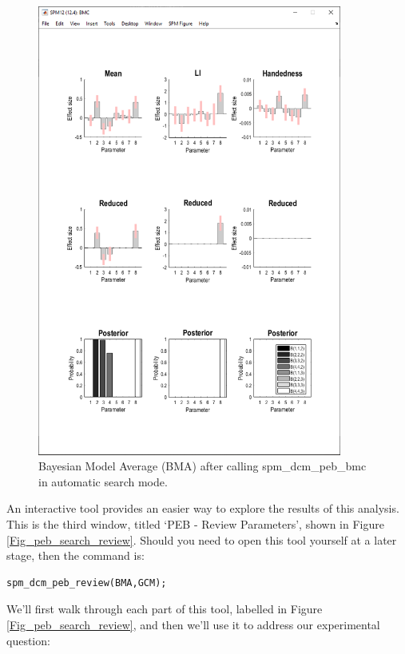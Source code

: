 \documentclass{article}
\begin{document}
\begin{figure}[ht]
\begin{center}
\includegraphics[width=10cm]{"Fig_peb_search_part2"}
\caption{Bayesian Model Average (BMA) after calling spm\_dcm\_peb\_bmc in automatic search mode.\label{Fig_peb_search_part2}}
\end{center}
\end{figure}

An interactive tool provides an easier way to explore the results of this analysis. This is the third window, titled `PEB - Review Parameters', shown in Figure \ref{Fig_peb_search_review}. Should you need to open this tool yourself at a later stage, then the command is:

\begin{lstlisting}[style=Matlab-editor,caption=PEB review tool]
spm_dcm_peb_review(BMA,GCM);
\end{lstlisting}

We'll first walk through each part of this tool, labelled in Figure \ref{Fig_peb_search_review}, and then we'll use it to address our experimental question:
\end{document}
